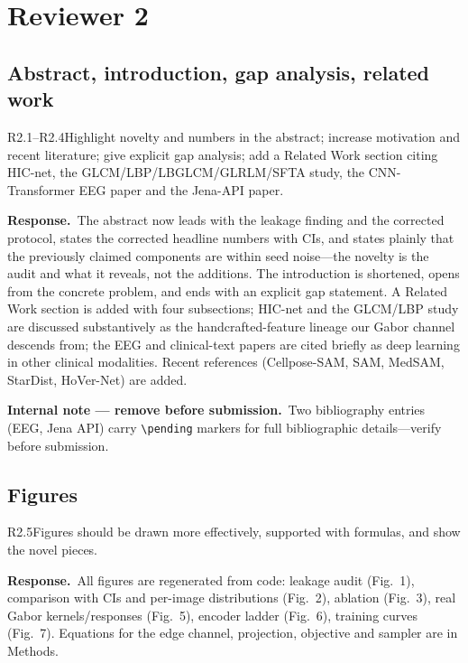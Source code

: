 \documentclass[11pt]{article}
\newif\ifinternal \internaltrue
\newcommand{\response}{\par\medskip\noindent\textbf{\color{bblue}Response.}\ }
\newcommand{\internalnote}[1]{\ifinternal\begin{tcolorbox}[breakable,colback=notebg,colframe=notefr,boxrule=0.5pt,arc=2pt]\footnotesize\textbf{Internal note --- remove before submission.}\ #1\end{tcolorbox}\fi}
\begin{document}
\section{Reviewer 2}
\subsection*{Abstract, introduction, gap analysis, related work}
\begin{rcomment}{R2.1--R2.4}Highlight novelty and numbers in the abstract; increase motivation and recent literature; give explicit gap analysis; add a Related Work section citing HIC-net, the GLCM/LBP/LBGLCM/GLRLM/SFTA study, the CNN-Transformer EEG paper and the Jena-API paper.\end{rcomment}
\response The abstract now leads with the leakage finding and the corrected protocol, states the corrected headline numbers with CIs, and states plainly that the previously claimed components are within seed noise---the novelty is the audit and what it reveals, not the additions. The introduction is shortened, opens from the concrete problem, and ends with an explicit gap statement. A Related Work section is added with four subsections; HIC-net and the GLCM/LBP study are discussed substantively as the handcrafted-feature lineage our Gabor channel descends from; the EEG and clinical-text papers are cited briefly as deep learning in other clinical modalities. Recent references (Cellpose-SAM, SAM, MedSAM, StarDist, HoVer-Net) are added. \internalnote{Two bibliography entries (EEG, Jena API) carry \texttt{\textbackslash pending} markers for full bibliographic details---verify before submission.}

\subsection*{Figures}
\begin{rcomment}{R2.5}Figures should be drawn more effectively, supported with formulas, and show the novel pieces.\end{rcomment}
\response All figures are regenerated from code: leakage audit (Fig.~1), comparison with CIs and per-image distributions (Fig.~2), ablation (Fig.~3), real Gabor kernels/responses (Fig.~5), encoder ladder (Fig.~6), training curves (Fig.~7). Equations for the edge channel, projection, objective and sampler are in Methods.
\end{document}
